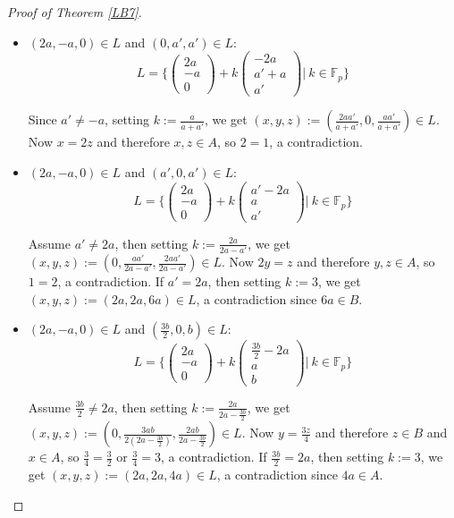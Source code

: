\documentclass[12pt]{amsart}
\newcommand{\<}{\langle}
\renewcommand{\>}{\rangle}
\numberwithin{equation}{section}
\numberwithin{theorem}{section}
\begin{document}
\begin{proof}[Proof of Theorem \ref{LB7}]
\begin{itemize}
Since $3b'\neq b$, setting $k:=\frac{b}{b-3b'}$, we get $(x,y,z):=(-\frac{3bb'}{b-3b'},0,\frac{bb'}{b-3b'})\in L$. Now $x=-3z$ and therefore $x,z\in A$, so $-3=1$, a contradiction.



    \item $(2a,-a,0)\in L$ and $(0,a',a')\in L$: $$L=\bigg\{\begin{pmatrix}
2a\\
-a\\
0
\end{pmatrix}+k\begin{pmatrix}
-2a\\
a'+a\\
a'
\end{pmatrix}\bigg|\ k\in\mathbb{F}_p\bigg\}$$ 


Since $a'\neq -a$, setting $k:=\frac{a}{a+a'}$, we get $(x,y,z):=(\frac{2aa'}{a+a'},0,\frac{aa'}{a+a'})\in L$. Now $x=2z$ and therefore $x,z\in A$, so $2=1$, a contradiction.


    \item $(2a,-a,0)\in L$ and $(a',0,a')\in L$: $$L=\bigg\{\begin{pmatrix}
2a\\
-a\\
0
\end{pmatrix}+k\begin{pmatrix}
a'-2a\\
a\\
a'
\end{pmatrix}\bigg|\ k\in\mathbb{F}_p\bigg\}$$ 


Assume $a'\neq 2a$, then setting $k:=\frac{2a}{2a-a'}$, we get $(x,y,z):=(0,\frac{aa'}{2a-a'},\frac{2aa'}{2a-a'})\in L$. Now $2y=z$ and therefore $y,z\in A$, so $1=2$, a contradiction.
If $a'=2a$, then setting $k:=3$, we get $(x,y,z):=(2a,2a,6a)\in L$, a contradiction since $6a\in B$.


\item $(2a,-a,0)\in L$ and $(\frac{3b}{2},0,b)\in L$: $$L=\bigg\{\begin{pmatrix}
2a\\
-a\\
0
\end{pmatrix}+k\begin{pmatrix}
\frac{3b}{2}-2a\\
a\\
b
\end{pmatrix}\bigg|\ k\in\mathbb{F}_p\bigg\}$$ 


Assume $\frac{3b}{2}\neq 2a$, then setting $k:=\frac{2a}{2a-\frac{3b}{2}}$, we get $(x,y,z):=(0,\frac{3ab}{2(2a-\frac{3b}{2})},\frac{2ab}{2a-\frac{3b}{2}})\in L$. Now $y=\frac{3z}{4}$ and therefore $z\in B$ and $x\in A$, so $\frac{3}{4}=\frac{3}{2}$ or $\frac{3}{4}=3$, a contradiction.
If $\frac{3b}{2}= 2a$, then setting $k:=3$, we get $(x,y,z):=(2a,2a,4a)\in L$, a contradiction since $4a\in A$.




\end{itemize}
\end{proof}
\end{document}
